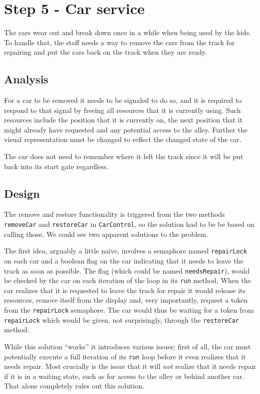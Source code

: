 \section{Step 5 - Car service}

The cars wear out and break down once in a while when being used by the kids. To handle that, the staff needs a way to remove the cars from the track for repairing and put the cars back on the track when they are ready.

\subsection{Analysis}

For a car to be removed it needs to be signaled to do so, and it is required to respond to that signal by freeing all resources that it is currently using. Such resources include the position that it is currently on, the next position that it might already have requested and any potential access to the alley. Further the visual representation must be changed to reflect the changed state of the car.

The car does not need to remember where it left the track since it will be put back into its start gate regardless.

\subsection{Design}

The remove and restore functionality is triggered from the two methods \texttt{removeCar} and \texttt{restoreCar} in \texttt{CarControl}, so the solution had to be be based on calling those. We could see two apparent solutions to the problem.

The first idea, arguably a little na\"ive, involves a semaphore named \texttt{repairLock} on each car and a boolean flag on the car indicating that it needs to leave the track as soon as possible. The flag (which could be named \texttt{needsRepair}), would be checked by the car on each iteration of the loop in its \texttt{run} method. When the car realizes that it is requested to leave the track for repair it would release its resources, remove itself from the display and, very importantly, request a token from the \texttt{repairLock} semaphore. The car would thus be waiting for a token from \texttt{repairLock} which would be given, not surprisingly, through the \texttt{restoreCar} method.

While this solution ``works'' it introduces various issues; first of all, the car must potentially execute a full iteration of its \texttt{run} loop before it even realizes that it needs repair. Most crucially is the issue that it will \emph{not} realize that it needs repair if it is in a waiting state, such as for access to the alley or behind another car. That alone completely rules out this solution.


